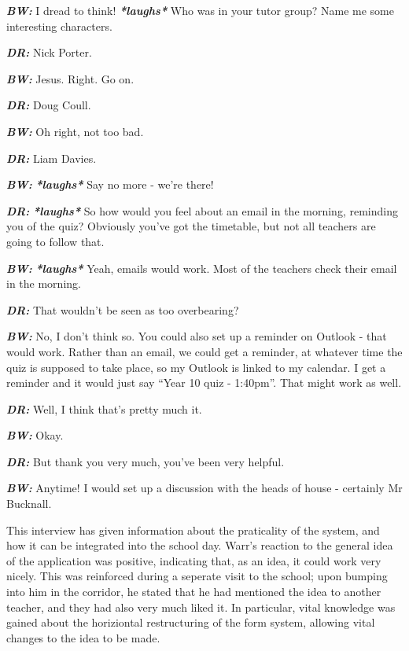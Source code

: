 \textit{\textbf{BW:}} I dread to think! \textit{\textbf{*laughs*}} Who was in your tutor group? Name me some interesting characters.

\textit{\textbf{DR:}} Nick Porter.

\textit{\textbf{BW:}} Jesus. Right. Go on.

\textit{\textbf{DR:}} Doug Coull.

\textit{\textbf{BW:}} Oh right, not too bad.

\textit{\textbf{DR:}} Liam Davies.

\textit{\textbf{BW:}} \textit{\textbf{*laughs*}} Say no more - we're there!

\textit{\textbf{DR:}} \textit{\textbf{*laughs*}} So how would you feel about an email in the morning, reminding you of the quiz? Obviously you've got the timetable, but not all teachers are going to follow that.

\textit{\textbf{BW:}} \textit{\textbf{*laughs*}} Yeah, emails would work. Most of the teachers check their email in the morning.

\textit{\textbf{DR:}} That wouldn't be seen as too overbearing?

\textit{\textbf{BW:}} No, I don't think so. You could also set up a reminder on Outlook - that would work. Rather than an email, we could get a reminder, at whatever time the quiz is supposed to take place, so my Outlook is linked to my calendar. I get a reminder and it would just say ``Year 10 quiz - 1:40pm''. That might work as well.

\textit{\textbf{DR:}} Well, I think that's pretty much it.

\textit{\textbf{BW:}} Okay.

\textit{\textbf{DR:}} But thank you very much, you've been very helpful.

\textit{\textbf{BW:}} Anytime! I would set up a discussion with the heads of house - certainly Mr Bucknall.

This interview has given information about the praticality of the system, and how it can be integrated into the school day. Warr's reaction to the general idea of the application was positive, indicating that, as an idea, it could work very nicely. This was reinforced during a seperate visit to the school; upon bumping into him in the corridor, he stated that he had mentioned the idea to another teacher, and they had also very much liked it. In particular, vital knowledge was gained about the horiziontal restructuring of the form system, allowing vital changes to the idea to be made.
